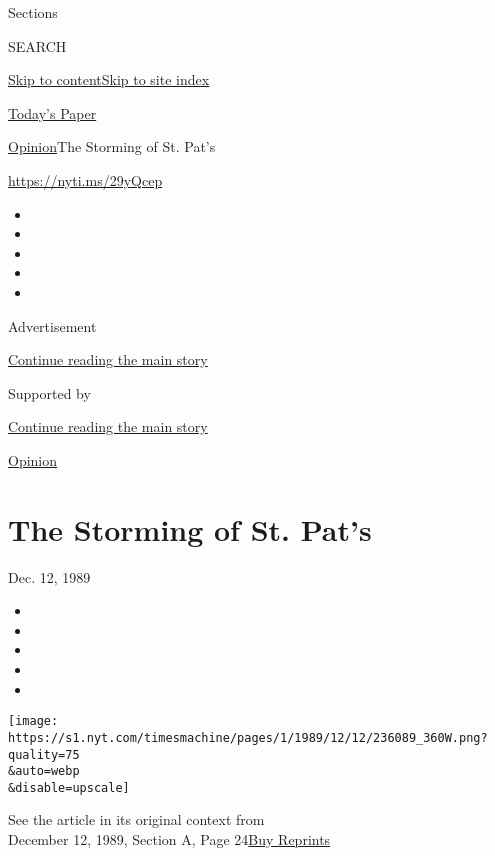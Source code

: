 Sections

SEARCH

\protect\hyperlink{site-content}{Skip to
content}\protect\hyperlink{site-index}{Skip to site index}

\href{https://myaccount.nytimes.com/auth/login?response_type=cookie\&client_id=vi}{}

\href{https://www.nytimes.com/section/todayspaper}{Today's Paper}

\href{/section/opinion}{Opinion}\textbar{}The Storming of St. Pat's

\href{https://nyti.ms/29yQcep}{https://nyti.ms/29yQcep}

\begin{itemize}
\item
\item
\item
\item
\item
\end{itemize}

Advertisement

\protect\hyperlink{after-top}{Continue reading the main story}

Supported by

\protect\hyperlink{after-sponsor}{Continue reading the main story}

\href{/section/opinion}{Opinion}

\hypertarget{the-storming-of-st-pats}{%
\section{The Storming of St. Pat's}\label{the-storming-of-st-pats}}

Dec. 12, 1989

\begin{itemize}
\item
\item
\item
\item
\item
\end{itemize}

\texttt{[image: https://s1.nyt.com/timesmachine/pages/1/1989/12/12/236089\_360W.png?quality=75\\\&auto=webp\\\&disable=upscale]}

See the article in its original context from\\
December 12, 1989, Section A, Page
24\href{https://store.nytimes.com/collections/new-york-times-page-reprints?utm_source=nytimes\&utm_medium=article-page\&utm_campaign=reprints}{Buy
Reprints}


